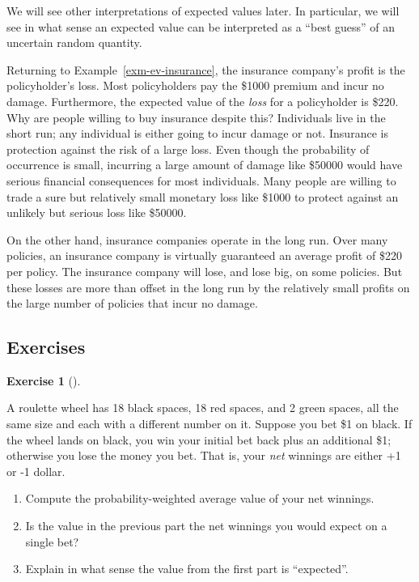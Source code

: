 \documentclass[
  letterpaper,
  DIV=11,
  numbers=noendperiod]{scrreprt}
\providecommand{\tightlist}{%
  \setlength{\itemsep}{0pt}\setlength{\parskip}{0pt}}
\theoremstyle{plain}
\theoremstyle{definition}
\theoremstyle{definition}
\newtheorem{exercise}{Exercise}[chapter]
\theoremstyle{definition}
\theoremstyle{remark}
\begin{document}
We will see other interpretations of expected values later. In
particular, we will see in what sense an expected value can be
interpreted as a ``best guess'' of an uncertain random quantity.

Returning to Example~\ref{exm-ev-insurance}, the insurance company's
profit is the policyholder's loss. Most policyholders pay the \$1000
premium and incur no damage. Furthermore, the expected value of the
\emph{loss} for a policyholder is \$220. Why are people willing to buy
insurance despite this? Individuals live in the short run; any
individual is either going to incur damage or not. Insurance is
protection against the risk of a large loss. Even though the probability
of occurrence is small, incurring a large amount of damage like \$50000
would have serious financial consequences for most individuals. Many
people are willing to trade a sure but relatively small monetary loss
like \$1000 to protect against an unlikely but serious loss like
\$50000.

On the other hand, insurance companies operate in the long run. Over
many policies, an insurance company is virtually guaranteed an average
profit of \$220 per policy. The insurance company will lose, and lose
big, on some policies. But these losses are more than offset in the long
run by the relatively small profits on the large number of policies that
incur no damage.

\subsection{Exercises}\label{exercises-6}

\begin{exercise}[]\protect\hypertarget{exr-ev-literacy-roulette-color}{}\label{exr-ev-literacy-roulette-color}

A roulette wheel has 18 black spaces, 18 red spaces, and 2 green spaces,
all the same size and each with a different number on it. Suppose you
bet \$1 on black. If the wheel lands on black, you win your initial bet
back plus an additional \$1; otherwise you lose the money you bet. That
is, your \emph{net} winnings are either +1 or -1 dollar.

\begin{enumerate}
\def\labelenumi{\arabic{enumi}.}
\tightlist
\item
  Compute the probability-weighted average value of your net winnings.
\item
  Is the value in the previous part the net winnings you would expect on
  a single bet?
\item
  Explain in what sense the value from the first part is ``expected''.
\end{enumerate}

\end{exercise}
\end{document}
